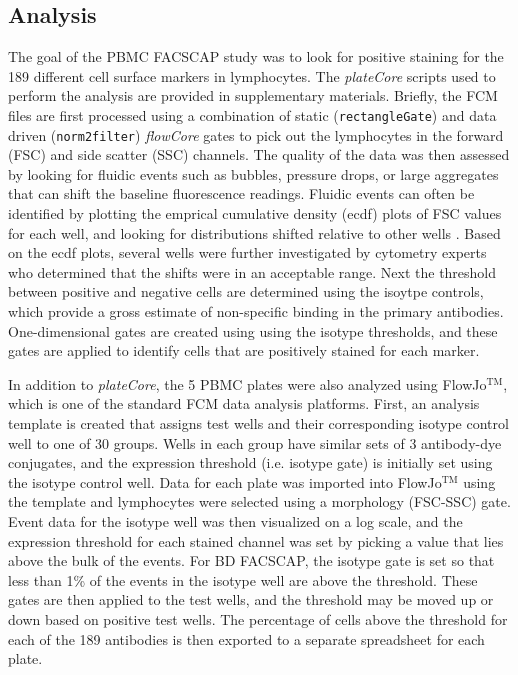 \documentclass[12pt]{article}
\newcommand{\Robject}[1]{{\texttt{#1}}}
\newcommand{\Rpackage}[1]{{\textit{#1}}}
\begin{document}
\subsection*{Analysis}

The goal of the PBMC FACS\texttrademark CAP study was to look for positive staining for the 189 different cell
surface markers in lymphocytes. The \Rpackage{plateCore} scripts used to perform the analysis are provided 
in supplementary materials. Briefly, the FCM files are first processed using a combination of static (\Robject{rectangleGate})
and data driven (\Robject{norm2filter}) \Rpackage{flowCore} gates to pick out the lymphocytes in the forward (FSC) and side scatter (SSC)
channels.  The quality of the data was then assessed by looking for fluidic events such as bubbles,
pressure drops, or large aggregates that can shift the baseline fluorescence readings. 
Fluidic events can often be identified by plotting the emprical cumulative density (ecdf) plots of FSC
values for each well, and looking for distributions shifted relative to other wells \citep{lemeur2007}. Based on the ecdf
plots, several wells were further investigated by cytometry experts who determined that the shifts were in an acceptable range.
Next the threshold between positive and negative cells are determined using the isoytpe controls, which provide a gross estimate
of non-specific binding in the primary antibodies. One-dimensional gates are created using using the isotype thresholds, and these
gates are applied to identify cells that are positively stained for each marker. 

In addition to \Rpackage{plateCore}, the 5 PBMC plates were also analyzed using FlowJo$^{\text{TM}}$,
which is one of the standard FCM data analysis platforms. First, an analysis template is created that
assigns test wells and their corresponding isotype control well to one of 30 groups. Wells in each
group have similar sets of 3 antibody-dye conjugates, and the expression threshold (i.e. isotype gate)
is initially set using the isotype control well. Data for each plate was imported into FlowJo$^{\text{TM}}$
using the template and
lymphocytes were selected using a morphology (FSC-SSC) gate. Event data for the isotype well was then
visualized on a log scale, and the expression threshold for each stained channel was set by picking a
value that lies above the bulk of the events. For BD FACS\texttrademark CAP, the isotype gate is set so that less than
1\% of the events in the isotype well are above the threshold. These gates are then applied to the test
wells, and the threshold may be moved up or down based on positive test wells. The percentage
of cells above the threshold for each of the 189 antibodies is then exported to a separate spreadsheet for 
each plate.
\end{document}
